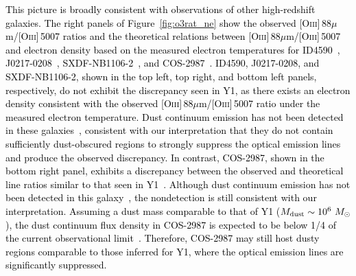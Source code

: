\documentclass[trackchanges,twocolumn]{aastex701}
\newcommand{\cq}[1]{\textcolor{black}{#1}}
\begin{document}
\cq{This picture is broadly consistent with observations of other high-redshift galaxies. 
The right panels of Figure~\ref{fig:o3rat_ne} show the observed [\textsc{Oiii}]\,88$\mu$m/[\textsc{Oiii}]\,5007 ratios and the theoretical relations between [\textsc{Oiii}]\,88$\mu$m/[\textsc{Oiii}]\,5007 and electron density based on the measured electron temperatures for ID4590~\citep[$z\sim8.5$;][]{Fujimoto2024}, J0217-0208~\citep[$z\sim6.2$;][]{Harikane2025}, SXDF-NB1106-2~\citep[$z\sim7.2$;][]{Harikane2025}, and  COS-2987~\citep[$z\sim6.8$;][]{Usui2025}. ID4590, J0217-0208, and SXDF-NB1106-2, shown in the top left, top right, and bottom left panels, respectively, do not exhibit the discrepancy seen in Y1, as there exists an electron density consistent with the observed [\textsc{Oiii}]\,88$\mu$m/[\textsc{Oiii}]\,5007 ratio under the measured electron temperature. Dust continuum emission has not been detected in these galaxies~\citep{Fujimoto2024,Inoue2016,Ren2023,Harikane2025}, consistent with our interpretation that they do not contain sufficiently dust-obscured regions to strongly suppress the optical emission lines and produce the observed discrepancy. In contrast, COS-2987, shown in the bottom right panel, exhibits a discrepancy between the observed and theoretical line ratios similar to that seen in Y1~\citep{Usui2025}. Although dust continuum emission has not been detected in this galaxy~\citep{Smit2018,Witstok2022}, the nondetection is still consistent with our interpretation. Assuming a dust mass comparable to that of Y1 ($M_{\rm dust}\sim10^6~M_\odot$), the dust continuum flux density in COS-2987 is expected to be below 1/4 of the current observational limit~\citep[$M_{\rm dust}\lesssim4\times10^6~M_\odot$ assuming $T_{\rm dust}=50$~K and $\beta_{\rm IR}=1.5$;][]{Witstok2022}. Therefore, COS-2987 may still host dusty regions comparable to those inferred for Y1, where the optical emission lines are significantly suppressed.}
\end{document}
